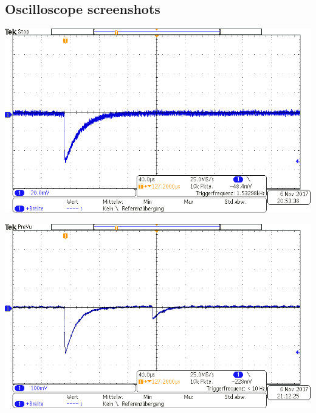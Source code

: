 \subsection*{Oscilloscope screenshots}
%
\begin{multicols}{2}
%
\minipage{\linewidth}
    \begin{center}
        \captionsetup{type=figure}
        \begin{adjustbox}{max width=\linewidth, keepaspectratio}
            \includegraphics[]{png/tek00000}
        \end{adjustbox}
        \label{fig:OsciSignal1}
    \end{center}
\endminipage
%
\vspace{10mm}
%
\minipage{\linewidth}
    \begin{center}
        \captionsetup{type=figure}
        \begin{adjustbox}{max width=\linewidth, keepaspectratio}
            \includegraphics[]{png/tek00001}
        \end{adjustbox}

\end{center}
\end{multicols}
